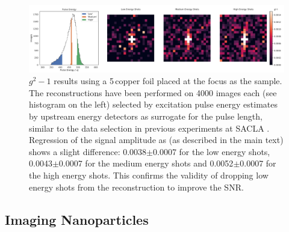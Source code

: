 \begin{figure}
	\centering
	\includegraphics[width=\linewidth]{images/energy_binned.pdf}
	\caption[Excitation energy binned reconstruction]{$g^2-1$ results using a 5\,\micrometer copper foil placed at the focus as the sample. The reconstructions have been performed on 4000 images each (see histogram on the left)  selected by excitation pulse energy estimates by upstream energy detectors as surrogate for the pulse length, similar to the data selection in previous experiments at SACLA \cite{inoue2019}. Regression of the signal amplitude as (as described in the main text) shows a slight difference: 0.0038$\pm$0.0007 for the low energy shots, 0.0043$\pm$0.0007 for the medium energy shots and 0.0052$\pm$0.0007 for the high energy shots. This confirms the validity of dropping low energy shots from the reconstruction to improve the SNR.}
	\label{fig:energy_binned}
\end{figure}

\subsection{Imaging Nanoparticles}

